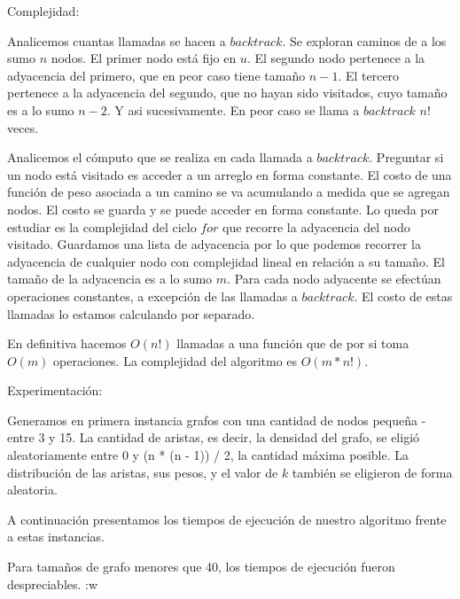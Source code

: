 Complejidad:

Analicemos cuantas llamadas se hacen a $backtrack$. Se exploran caminos de a los sumo $n$ nodos. El primer nodo está fijo en $u$. El segundo nodo
pertenece a la adyacencia del primero, que en peor caso tiene tamaño $n - 1$. El tercero pertenece a la adyacencia del segundo, que no hayan sido
visitados, cuyo tamaño es a lo sumo $n - 2$. Y asi sucesivamente. En peor caso se llama a $backtrack$ $n!$ veces.

Analicemos el cómputo que se realiza en cada llamada a $backtrack$. Preguntar si un nodo está visitado es acceder a un arreglo en forma constante.
El costo de una función de peso asociada a un camino se va acumulando a medida que se agregan nodos. El costo se guarda y se puede acceder en
forma constante. Lo queda por estudiar es la complejidad del ciclo $for$ que recorre la adyacencia del nodo visitado. Guardamos una lista de
adyacencia por lo que podemos recorrer la adyacencia de cualquier nodo con complejidad lineal en relación a su tamaño. El tamaño de la adyacencia
es a lo sumo $m$. Para cada nodo adyacente se efectúan operaciones constantes, a excepción de las llamadas a $backtrack$. El costo de estas
llamadas lo estamos calculando por separado.

En definitiva hacemos $O(n!)$ llamadas a una función que de por si toma $O(m)$ operaciones. La complejidad del algoritmo es $O(m*n!)$.

Experimentación:

Generamos en primera instancia grafos con una cantidad de nodos pequeña - entre 3 y 15. La cantidad de aristas, es decir, la densidad del grafo,
se eligió aleatoriamente entre 0 y (n * (n - 1)) / 2, la cantidad máxima posible. La distribución de las aristas, sus pesos, y el valor de $k$
también se eligieron de forma aleatoria.

A continuación presentamos los tiempos de ejecución de nuestro algoritmo frente a estas instancias. 



Para tamaños de grafo menores que 40, los tiempos de ejecución fueron despreciables. :w
